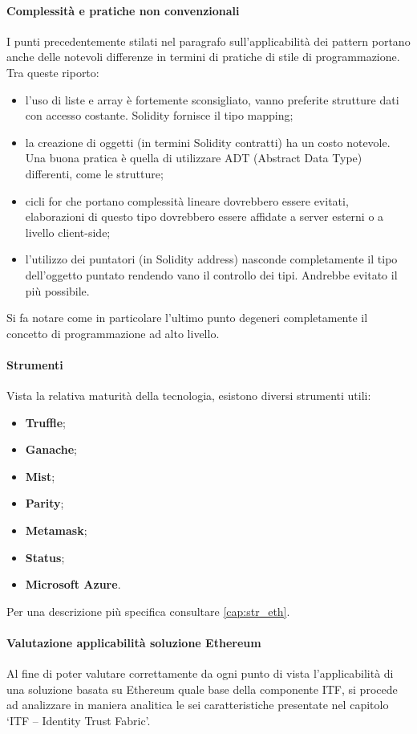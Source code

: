 \paragraph{Complessità e pratiche non convenzionali}
\label{cap:prestazioni}
I punti precedentemente stilati nel paragrafo sull’applicabilità dei pattern portano anche delle notevoli differenze in termini di pratiche di stile di programmazione. Tra queste riporto:
\begin{itemize}
    \item l’uso di liste e array è fortemente sconsigliato, vanno preferite strutture dati con accesso costante. Solidity fornisce il tipo mapping;
    \item la creazione di oggetti (in termini Solidity contratti) ha un costo notevole. Una buona pratica è quella di utilizzare ADT (Abstract Data Type) differenti, come le strutture;
    \item cicli for che portano complessità lineare dovrebbero essere evitati, elaborazioni di questo tipo dovrebbero essere affidate a server esterni o a livello client-side;
    \item l’utilizzo dei puntatori (in Solidity address) nasconde completamente il tipo dell’oggetto puntato rendendo vano il controllo dei tipi. Andrebbe evitato il più possibile.
\end{itemize}
Si fa notare come in particolare l’ultimo punto degeneri completamente il concetto di programmazione ad alto livello.

\paragraph{Strumenti}
Vista la relativa maturità della tecnologia, esistono diversi strumenti utili:
\begin{itemize}
    \item \textbf{Truffle};
    \item \textbf{Ganache};
    \item \textbf{Mist};
    \item \textbf{Parity};
    \item \textbf{Metamask};
    \item \textbf{Status};
    \item \textbf{Microsoft Azure}.
\end{itemize}
Per una descrizione più specifica consultare \ref{cap:str_eth}.

\paragraph{Valutazione applicabilità soluzione Ethereum}
Al fine di poter valutare correttamente da ogni punto di vista l’applicabilità di una soluzione basata su Ethereum quale base della componente ITF, si procede ad analizzare in maniera analitica le sei caratteristiche presentate nel capitolo ‘ITF – Identity Trust Fabric’.

